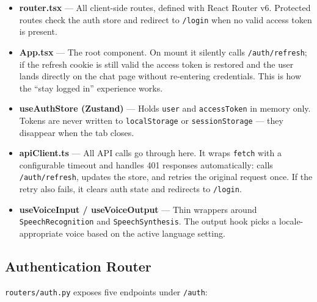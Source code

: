 \begin{itemize}
  \item \textbf{router.tsx} --- All client-side routes, defined with React Router v6.
        Protected routes check the auth store and redirect to \texttt{/login} when no
        valid access token is present.

  \item \textbf{App.tsx} --- The root component. On mount it silently calls
        \texttt{/auth/refresh}; if the refresh cookie is still valid the access token
        is restored and the user lands directly on the chat page without re-entering
        credentials. This is how the ``stay logged in'' experience works.

  \item \textbf{useAuthStore (Zustand)} --- Holds \texttt{user} and
        \texttt{accessToken} in memory only. Tokens are never written to
        \texttt{localStorage} or \texttt{sessionStorage} --- they disappear when the
        tab closes.

  \item \textbf{apiClient.ts} --- All API calls go through here. It wraps \texttt{fetch}
        with a configurable timeout and handles 401 responses automatically: calls
        \texttt{/auth/refresh}, updates the store, and retries the original request once.
        If the retry also fails, it clears auth state and redirects to \texttt{/login}.

  \item \textbf{useVoiceInput / useVoiceOutput} --- Thin wrappers around
        \texttt{SpeechRecognition} and \texttt{SpeechSynthesis}. The output hook picks
        a locale-appropriate voice based on the active language setting.
\end{itemize}

\subsection{Authentication Router}
\label{sec:auth-router}

\texttt{routers/auth.py} exposes five endpoints under \texttt{/auth}:

